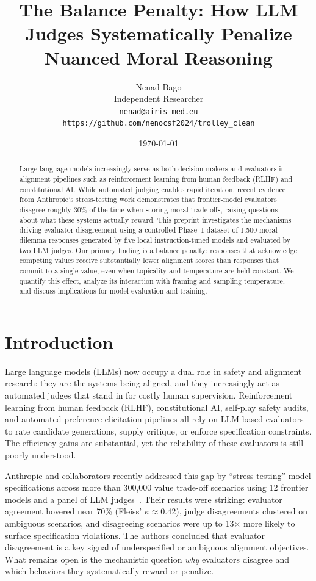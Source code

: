 \documentclass[11pt]{article}
\title{The Balance Penalty: How LLM Judges Systematically Penalize Nuanced Moral Reasoning}
\author{
Nenad Bago \\
Independent Researcher \\
\texttt{nenad@airis-med.eu} \\
\texttt{https://github.com/nenocsf2024/trolley\_clean}
}
\date{\today}
\begin{document}
\maketitle

\begin{abstract}
Large language models increasingly serve as both decision-makers and evaluators in alignment pipelines such as reinforcement learning from human feedback (RLHF) and constitutional AI. While automated judging enables rapid iteration, recent evidence from Anthropic's stress-testing work demonstrates that frontier-model evaluators disagree roughly 30\% of the time when scoring moral trade-offs, raising questions about what these systems actually reward. This preprint investigates the mechanisms driving evaluator disagreement using a controlled Phase~1 dataset of 1{,}500 moral-dilemma responses generated by five local instruction-tuned models and evaluated by two LLM judges. Our primary finding is a balance penalty: responses that acknowledge competing values receive substantially lower alignment scores than responses that commit to a single value, even when topicality and temperature are held constant. We quantify this effect, analyze its interaction with framing and sampling temperature, and discuss implications for model evaluation and training.
\end{abstract}

\section{Introduction}

Large language models (LLMs) now occupy a dual role in safety and alignment research: they are the systems being aligned, and they increasingly act as automated judges that stand in for costly human supervision. Reinforcement learning from human feedback (RLHF), constitutional AI, self-play safety audits, and automated preference elicitation pipelines all rely on LLM-based evaluators to rate candidate generations, supply critique, or enforce specification constraints. The efficiency gains are substantial, yet the reliability of these evaluators is still poorly understood.

Anthropic and collaborators recently addressed this gap by ``stress-testing'' model specifications across more than 300{,}000 value trade-off scenarios using 12 frontier models and a panel of LLM judges~\citep{zhang2025stresstest}. Their results were striking: evaluator agreement hovered near 70\% (Fleiss' $\kappa \approx 0.42$), judge disagreements clustered on ambiguous scenarios, and disagreeing scenarios were up to 13$\times$ more likely to surface specification violations. The authors concluded that evaluator disagreement is a key signal of underspecified or ambiguous alignment objectives. What remains open is the mechanistic question \emph{why} evaluators disagree and which behaviors they systematically reward or penalize.
\end{document}
